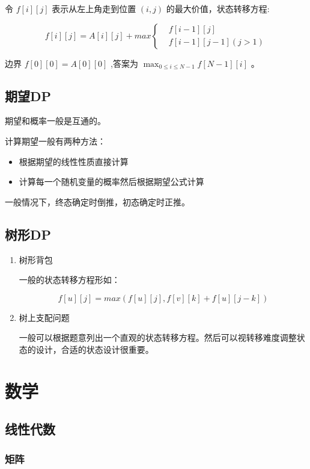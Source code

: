 \documentclass[11pt]{article}
\begin{document}
令 $f[i][j]$ 表示从左上角走到位置 $(i,j)$ 的最大价值，状态转移方程:

$$
f[i][j]=A[i][j]+max\left\{\begin{aligned}
&f[i-1][j]\\
&f[i-1][j-1] (j>1)
\end{aligned}\right.
$$

边界 $f[0][0]=A[0][0]$ ,答案为 $\max_{0 \leq i \leq N-1} f[N-1][i]$ 。

\subsection{期望DP}
\label{sec-2-4}

期望和概率一般是互通的。

计算期望一般有两种方法：

\begin{itemize}
\item 根据期望的线性性质直接计算
\item 计算每一个随机变量的概率然后根据期望公式计算
\end{itemize}

一般情况下，终态确定时倒推，初态确定时正推。
\subsection{树形DP}
\label{sec-2-5}

\begin{enumerate}
\item 树形背包
\label{sec-2-5-0-1}

一般的状态转移方程形如：

$$
f[u][j] = max(f[u][j], f[v][k] + f[u][j - k])
$$

\item 树上支配问题
\label{sec-2-5-0-2}

一般可以根据题意列出一个直观的状态转移方程。然后可以视转移难度调整状态的设计，合适的状态设计很重要。
\end{enumerate}
\section{数学}
\label{sec-3}
\subsection{线性代数}
\label{sec-3-1}
\subsubsection{矩阵}
\label{sec-3-1-1}
\end{document}
